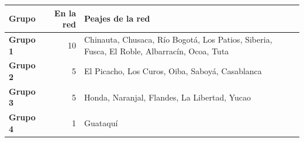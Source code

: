 \renewcommand{\arraystretch}{1.2}
\begin{tabular}{|l|r|>{\raggedright\arraybackslash}p{9.4cm}|}
\hline
\rowcolor{gray!20} \textbf{Grupo} & \textbf{En la red} & \textbf{Peajes de la red} \\
\hline
\textbf{Grupo 1} & 10 & Chinauta, Chusaca, Río Bogotá, Los Patios, Siberia, Fusca, El Roble, Albarracín, Ocoa, Tuta \\
\hline
\textbf{Grupo 2} & 5 & El Picacho, Los Curos, Oiba, Saboyá, Casablanca \\
\hline
\textbf{Grupo 3} & 5 & Honda, Naranjal, Flandes, La Libertad, Yucao \\
\hline
\textbf{Grupo 4} & 1 & Guataquí \\
\hline
\end{tabular}
